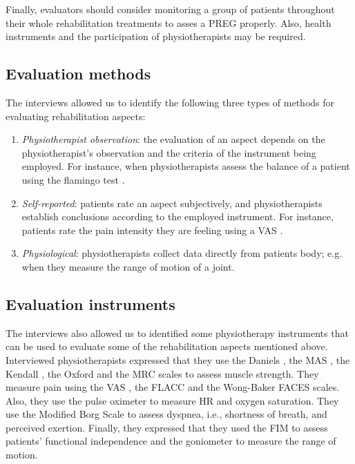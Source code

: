 Finally, evaluators should consider monitoring a group of patients throughout their whole rehabilitation treatments to asses a \ac{PREG} properly. Also, health instruments and the participation of physiotherapists may be required.

\subsection{Evaluation methods}
\label{sec:rehab_methods}
The interviews allowed us to identify the following three types of methods for evaluating rehabilitation aspects: 

\begin{enumerate}
  \item \emph{Physiotherapist observation}: the evaluation of an aspect depends on the physiotherapist's observation and the criteria of the instrument being employed. For instance, when physiotherapists assess the balance of a patient using the flamingo test \autocite{flamingo}. 
  \item \emph{Self-reported}: patients rate an aspect subjectively, and physiotherapists establish conclusions according to the employed instrument. For instance, patients rate the pain intensity they are feeling using a \ac{VAS} \autocite{vasScale}.
 \item \emph{Physiological}: physiotherapists collect data directly from patients body; e.g. when they measure the range of motion of a joint.
\end{enumerate}

\subsection{Evaluation instruments}
\label{sec:rehab_instruments}
The interviews also allowed us to identified some physiotherapy instruments that can be used to evaluate some of the rehabilitation aspects mentioned above. Interviewed physiotherapists expressed that they use the Daniels \autocite{danielsScale}, the \ac{MAS} \autocite{ashwortScale}, the Kendall \autocite{kendallScale}, the Oxford \autocite{oxfordScale} and the \ac{MRC} \autocite{mrcScale} scales to assess muscle strength. They measure pain using the \ac{VAS} \autocite{vasScale}, the \ac{FLACC} \autocite{flaccScale} and the Wong-Baker FACES \autocite{Baker} scales. Also, they use the pulse oximeter to measure \ac{HR} and oxygen saturation. They use the Modified Borg Scale \autocite{modifiedBorgScale_2014} to assess dyspnea, i.e., shortness of breath, and perceived exertion. Finally, they expressed that they used the \ac{FIM} \autocite{fim} to assess patients' functional independence and the goniometer \autocite{goniometry} to measure the range of motion. 

